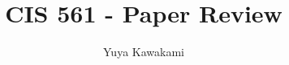 \renewcommand\footnotetextcopyrightpermission[1]{} %


\newenvironment{tightItemize}{
    \begin{itemize}
        \setlength{\itemsep}{1pt}
        \setlength{\parskip}{0pt}
        \setlength{\parsep}{0pt}
}{\end{itemize}
}

\usepackage{graphicx}
\usepackage{svg}
\usepackage{minted}
\usepackage{listings}
\usepackage{minted}



\usepackage[ruled,vlined]{algorithm2e}

\usepackage{multirow}
\usepackage{multicol}
\usepackage{makecell}

\usepackage{tikz} %
\usepackage{pgfplots}


\fancyfoot{}



\title{CIS 561 - Paper Review}

\author{Yuya Kawakami}


\maketitle
\pagestyle{empty}
\thispagestyle{empty}

